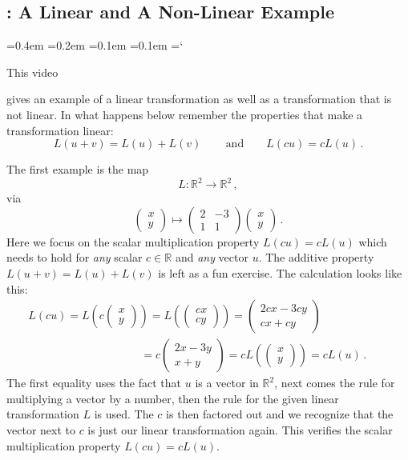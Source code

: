 
\subsection{\linTransTitle: A Linear and A Non-Linear Example}

{\ttfamily
{}\font=0.4em
\font=0.2em
\font=0.1em
\font=0.1em
\hyphenchar\font=`\-


\hypertarget{scripts_linear_transformations_example}{This video} gives
an example of  a linear transformation as well as a transformation that
is not linear. In what happens below remember the properties that 
make a transformation linear:
\[
L(u+v)=L(u)+L(v)\, \qquad\mbox{and} \qquad L(cu)=cL(u)\, .
\]


The first example is the map
\[
L:{\mathbb R}^2\longrightarrow {\mathbb R}^2\, ,
\]
via
\[
\begin{pmatrix}
x\\y
\end{pmatrix}
\mapsto 
\begin{pmatrix}
2&-3\\1&1
\end{pmatrix}
\begin{pmatrix}
x\\y
\end{pmatrix}\, .
\]
Here we focus on the scalar multiplication property $L(cu)=cL(u)$ which needs to hold for {\it any} scalar $c\in {\mathbb R}$
and {\it any} vector $u$. The additive property $L(u+v)=L(u)+L(v)$ is left as a fun exercise.
The calculation looks like this:
\begin{multline*}
L(cu)=L\left(c\begin{pmatrix}
x\\y
\end{pmatrix}\right)
=L\left(\begin{pmatrix}
cx\\cy
\end{pmatrix}\right)
=
\begin{pmatrix}
2cx-3cy\\cx+cy
\end{pmatrix}\qquad\qquad\qquad
\\
\qquad\qquad\qquad\qquad\qquad
=
c\begin{pmatrix}
2x-3y\\x+y
\end{pmatrix}
=cL\left(\begin{pmatrix}
x\\y
\end{pmatrix}\right)=cL(u)\, .
\end{multline*}
The first equality uses the fact that $u$ is a vector in ${\mathbb R}^2$, next comes the
rule for multiplying a vector by a number, then the rule for the given linear transformation $L$ is used.
The $c$ is then factored out and we recognize that the vector next to $c$ is just our linear transformation again.
This verifies the scalar multiplication property $L(cu)=cL(u)$.

}
